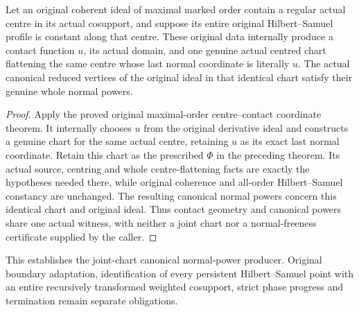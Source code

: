 \begin{theorem}
\label{hir:actual-original-joint-contact-canonical-normal-powers}
\leanok
Let an original coherent ideal of maximal marked order contain a regular actual centre in its actual cosupport, and suppose its entire original Hilbert--Samuel profile is constant along that centre. These original data internally produce a contact function $u$, its actual domain, and one genuine actual centred chart flattening the same centre whose last normal coordinate is literally $u$. The actual canonical reduced vertices of the original ideal in that identical chart satisfy their genuine whole normal powers.
\end{theorem}
\begin{proof}
Apply the proved original maximal-order centre--contact coordinate theorem. It internally chooses $u$ from the original derivative ideal and constructs a genuine chart for the same actual centre, retaining $u$ as its exact last normal coordinate. Retain this chart as the prescribed $\Phi$ in the preceding theorem. Its actual source, centring and whole centre-flattening facts are exactly the hypotheses needed there, while original coherence and all-order Hilbert--Samuel constancy are unchanged. The resulting canonical normal powers concern this identical chart and original ideal. Thus contact geometry and canonical powers share one actual witness, with neither a joint chart nor a normal-freeness certificate supplied by the caller.
\end{proof}

\begin{remark}
This establishes the joint-chart canonical normal-power producer. Original boundary adaptation, identification of every persistent Hilbert--Samuel point with an entire recursively transformed weighted cosupport, strict phase progress and termination remain separate obligations.
\end{remark}
